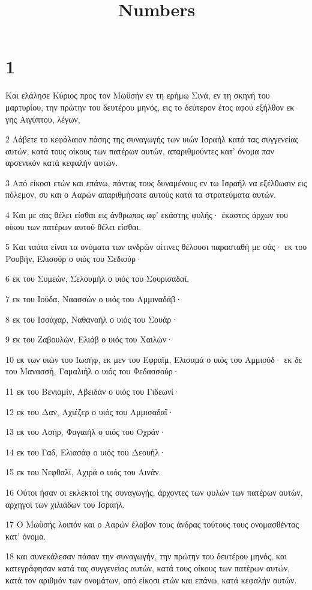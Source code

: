 

\title{Numbers}


\chapter{1}

\par Και ελάλησε Κύριος προς τον Μωϋσήν εν τη ερήμω Σινά, εν τη σκηνή του μαρτυρίου, την πρώτην του δευτέρου μηνός, εις το δεύτερον έτος αφού εξήλθον εκ γης Αιγύπτου, λέγων,
\par 2 Λάβετε το κεφάλαιον πάσης της συναγωγής των υιών Ισραήλ κατά τας συγγενείας αυτών, κατά τους οίκους των πατέρων αυτών, απαριθμούντες κατ' όνομα παν αρσενικόν κατά κεφαλήν αυτών.
\par 3 Από είκοσι ετών και επάνω, πάντας τους δυναμένους εν τω Ισραήλ να εξέλθωσιν εις πόλεμον, συ και ο Ααρών απαριθμήσατε αυτούς κατά τα στρατεύματα αυτών.
\par 4 Και με σας θέλει είσθαι εις άνθρωπος αφ' εκάστης φυλής· έκαστος άρχων του οίκου των πατέρων αυτού θέλει είσθαι.
\par 5 Και ταύτα είναι τα ονόματα των ανδρών οίτινες θέλουσι παρασταθή με σάς· εκ του Ρουβήν, Ελισούρ ο υιός του Σεδιούρ·
\par 6 εκ του Συμεών, Σελουμήλ ο υιός του Σουρισαδαΐ.
\par 7 εκ του Ιούδα, Ναασσών ο υιός του Αμμιναδάβ·
\par 8 εκ του Ισσάχαρ, Ναθαναήλ ο υιός του Σουάρ·
\par 9 εκ του Ζαβουλών, Ελιάβ ο υιός του Χαιλών·
\par 10 εκ των υιών του Ιωσήφ, εκ μεν του Εφραΐμ, Ελισαμά ο υιός του Αμμιούδ· εκ δε του Μανασσή, Γαμαλιήλ ο υιός του Φεδασσούρ·
\par 11 εκ του Βενιαμίν, Αβειδάν ο υιός του Γιδεωνί·
\par 12 εκ του Δαν, Αχιέζερ ο υιός του Αμμισαδαΐ·
\par 13 εκ του Ασήρ, Φαγαιήλ ο υιός του Οχράν·
\par 14 εκ του Γαδ, Ελιασάφ ο υιός του Δεουήλ·
\par 15 εκ του Νεφθαλί, Αχιρά ο υιός του Αινάν.
\par 16 Ούτοι ήσαν οι εκλεκτοί της συναγωγής, άρχοντες των φυλών των πατέρων αυτών, αρχηγοί των χιλιάδων του Ισραήλ.
\par 17 Ο Μωϋσής λοιπόν και ο Ααρών έλαβον τους άνδρας τούτους τους ονομασθέντας κατ' όνομα.
\par 18 και συνεκάλεσαν πάσαν την συναγωγήν, την πρώτην του δευτέρου μηνός, και κατεγράφησαν κατά τας συγγενείας αυτών, κατά τους οίκους των πατέρων αυτών, κατά τον αριθμόν των ονομάτων, από είκοσι ετών και επάνω, κατά κεφαλήν αυτών.

